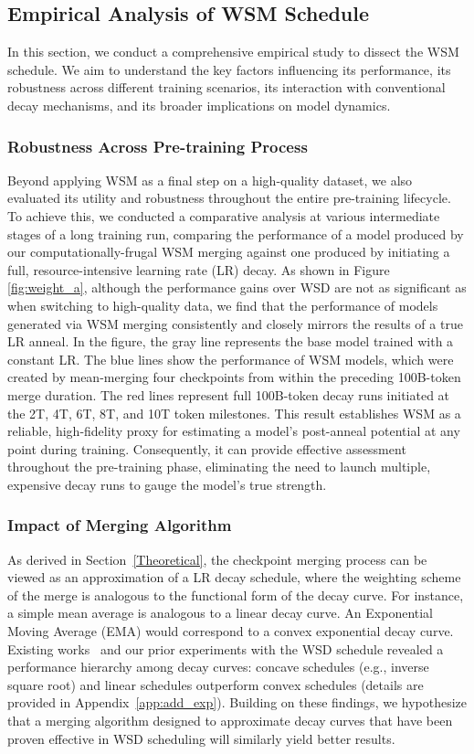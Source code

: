 \subsection{Empirical Analysis of WSM Schedule}
In this section, we conduct a comprehensive empirical study to dissect the WSM schedule. We aim to understand the key factors influencing its performance, its robustness across different training scenarios, its interaction with conventional decay mechanisms, and its broader implications on model dynamics.

\subsubsection{Robustness Across Pre-training Process}
Beyond applying WSM as a final step on a high-quality dataset, we also evaluated its utility and robustness throughout the entire pre-training lifecycle. To achieve this, we conducted a comparative analysis at various intermediate stages of a long training run, comparing the performance of a model produced by our computationally-frugal WSM merging against one produced by initiating a full, resource-intensive learning rate (LR) decay.
As shown in Figure \ref{fig:weight_a}, although the performance gains over WSD are not as significant as when switching to high-quality data, we find that the performance of models generated via WSM merging consistently and closely mirrors the results of a true LR anneal. In the figure, the gray line represents the base model trained with a constant LR. The blue lines show the performance of WSM models, which were created by mean-merging four checkpoints from within the preceding 100B-token merge duration. The red lines represent full 100B-token decay runs initiated at the 2T, 4T, 6T, 8T, and 10T token milestones. This result establishes WSM as a reliable, high-fidelity proxy for estimating a model's post-anneal potential at any point during training. Consequently, it can provide effective assessment throughout the pre-training phase, eliminating the need to launch multiple, expensive decay runs to gauge the model's true strength.


\subsubsection{Impact of Merging Algorithm}
As derived in Section~\ref{Theoretical}, the checkpoint merging process can be viewed as an approximation of a LR decay schedule, where the weighting scheme of the merge is analogous to the functional form of the decay curve. For instance, a simple mean average is analogous to a linear decay curve. An Exponential Moving Average (EMA) would correspond to a convex exponential decay curve.
Existing works~\citep{1sqrt} and our prior experiments with the WSD schedule revealed a performance hierarchy among decay curves: concave schedules (e.g., inverse square root) and linear schedules outperform convex schedules (details are provided in Appendix~\ref{app:add_exp}). Building on these findings, we hypothesize that a merging algorithm designed to approximate decay curves that have been proven effective in WSD scheduling will similarly yield better results.


